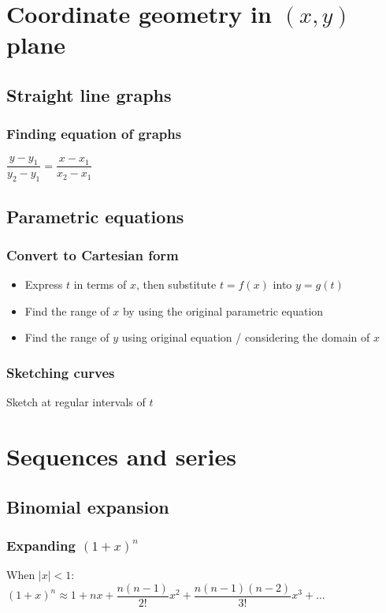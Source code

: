 \documentclass[A4paper]{article}
\begin{document}
	\pagebreak

	\section{Coordinate geometry in $(x,y)$ plane}
	
	\subsection{Straight line graphs}
	\subsubsection{Finding equation of graphs}
	$\dfrac{y-y_1}{y_2-y_1}=\dfrac{x-x_1}{x_2-x_1}$

	\subsection{Parametric equations}
	\subsubsection{Convert to Cartesian form}
	\begin{itemize}
		\item Express $t$ in terms of $x$, then substitute $t=f(x)$ into $y=g(t)$
		\item Find the range of $x$ by using the original parametric equation
		\item Find the range of $y$ using original equation / considering the domain of $x$
	\end{itemize}
	\subsubsection{Sketching curves}
	Sketch at regular intervals of $t$


	\pagebreak

	\section{Sequences and series}
	\subsection{Binomial expansion}
	\subsubsection{Expanding $(1+x)^n$}
	When $|x|<1$:\\
	$(1+x)^n\approx 1 + nx + \dfrac{n(n-1)}{2!}x^2+\dfrac{n(n-1)(n-2)}{3!}x^3+\dots$
\end{document}
